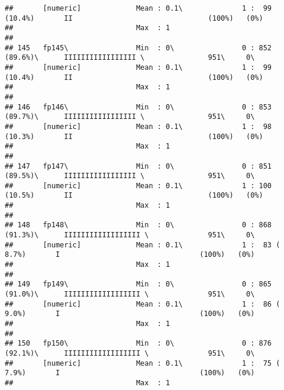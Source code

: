 \documentclass[]{article}
\begin{document}
\begin{verbatim}
##       [numeric]             Mean : 0.1\              1 :  99 (10.4%)       II                                (100%)   (0%)     
##                             Max  : 1                                                                                           
## 
## 145   fp145\                Min  : 0\                0 : 852 (89.6%)\      IIIIIIIIIIIIIIIII \               951\     0\       
##       [numeric]             Mean : 0.1\              1 :  99 (10.4%)       II                                (100%)   (0%)     
##                             Max  : 1                                                                                           
## 
## 146   fp146\                Min  : 0\                0 : 853 (89.7%)\      IIIIIIIIIIIIIIIII \               951\     0\       
##       [numeric]             Mean : 0.1\              1 :  98 (10.3%)       II                                (100%)   (0%)     
##                             Max  : 1                                                                                           
## 
## 147   fp147\                Min  : 0\                0 : 851 (89.5%)\      IIIIIIIIIIIIIIIII \               951\     0\       
##       [numeric]             Mean : 0.1\              1 : 100 (10.5%)       II                                (100%)   (0%)     
##                             Max  : 1                                                                                           
## 
## 148   fp148\                Min  : 0\                0 : 868 (91.3%)\      IIIIIIIIIIIIIIIIII \              951\     0\       
##       [numeric]             Mean : 0.1\              1 :  83 ( 8.7%)       I                                 (100%)   (0%)     
##                             Max  : 1                                                                                           
## 
## 149   fp149\                Min  : 0\                0 : 865 (91.0%)\      IIIIIIIIIIIIIIIIII \              951\     0\       
##       [numeric]             Mean : 0.1\              1 :  86 ( 9.0%)       I                                 (100%)   (0%)     
##                             Max  : 1                                                                                           
## 
## 150   fp150\                Min  : 0\                0 : 876 (92.1%)\      IIIIIIIIIIIIIIIIII \              951\     0\       
##       [numeric]             Mean : 0.1\              1 :  75 ( 7.9%)       I                                 (100%)   (0%)     
##                             Max  : 1                                                                                           

\end{verbatim}
\end{document}
